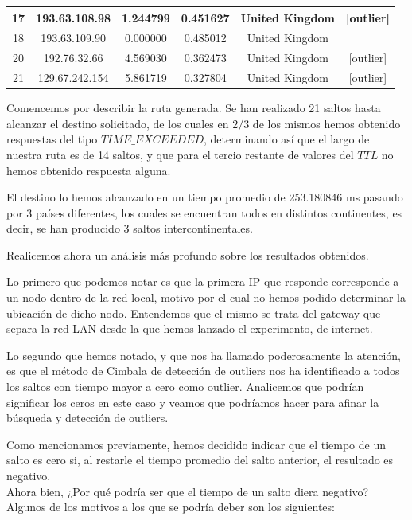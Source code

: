 \begin{table}[!htbp]
\begin{tabular}{|c|c|c|c|c|c|}
17           & 193.63.108.98   & 1.244799     & 0.451627                 & United Kingdom   & {[}outlier{]}     \\ \hline
18           & 193.63.109.90   & 0.000000     & 0.485012                 & United Kingdom   &                   \\ \hline
20           & 192.76.32.66    & 4.569030     & 0.362473                 & United Kingdom   & {[}outlier{]}     \\ \hline
21           & 129.67.242.154  & 5.861719     & 0.327804                 & United Kingdom   & {[}outlier{]}     \\ \hline
\end{tabular}
\end{table}


Comencemos por describir la ruta generada. Se han realizado 21 saltos hasta alcanzar el destino solicitado, de los cuales en $2/3$ de los mismos hemos obtenido respuestas del tipo $TIME\_EXCEEDED$, determinando así que el largo de nuestra ruta es de 14 saltos, y que para el tercio restante de valores del $TTL$ no hemos obtenido respuesta alguna.

El destino lo hemos alcanzado en un tiempo promedio de 253.180846 ms pasando por 3 países diferentes, los cuales se encuentran todos en distintos continentes, es decir, se han producido 3 saltos intercontinentales.

Realicemos ahora un análisis más profundo sobre los resultados obtenidos.

Lo primero que podemos notar es que la primera IP que responde corresponde a un nodo dentro de la red local, motivo por el cual no hemos podido determinar la ubicación de dicho nodo. Entendemos que el mismo se trata del gateway que separa la red LAN desde la que hemos lanzado el experimento, de internet. 

Lo segundo que hemos notado, y que nos ha llamado poderosamente la atención, es que el método de Cimbala de detección de outliers nos ha identificado a todos los saltos con tiempo mayor a cero como outlier. Analicemos que podrían significar los ceros en este caso y veamos que podríamos hacer para afinar la búsqueda y detección de outliers.

Como mencionamos previamente, hemos decidido indicar que el tiempo de un salto es cero si, al restarle el tiempo promedio del salto anterior, el resultado es negativo. \\
Ahora bien, ¿Por qué podría ser que el tiempo de un salto diera negativo? \\
Algunos de los motivos a los que se podría deber son los siguientes:

